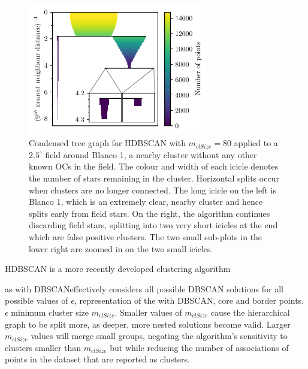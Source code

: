 \begin{figure}[t]
   \centering
   \includegraphics[width=0.7\textwidth]{fig/c2/fig_hdbscan.pdf}
   \caption{Condensed tree graph for HDBSCAN with $m_{clSize}=80$ applied to a $2.5^{\circ}$ field around Blanco 1, a nearby cluster without any other known OCs in the field. The colour and width of each icicle denotes the number of stars remaining in the cluster. Horizontal splits occur when clusters are no longer connected. The long icicle on the left is Blanco 1, which is an extremely clear, nearby cluster and hence splits early from field stars. On the right, the algorithm continues discarding field stars, splitting into two very short icicles at the end which are false positive clusters. The two small sub-plots in the lower right are zoomed in on the two small icicles.}\label{c2:fig:hdbscan}%
\end{figure}

HDBSCAN \citep{hutchison_hdbscan_2013} is a more recently developed clustering algorithm 

as with DBSCANeffectively considers all possible DBSCAN solutions for all possible values of $\epsilon$, representation of the with DBSCAN, core and border points. $\epsilon$ minimum cluster size $m_{clSize}$. Smaller values of $m_{clSize}$ cause the hierarchical graph to be split more, as deeper, more nested solutions become valid. Larger $m_{clSize}$ values will merge small groups, negating the algorithm's sensitivity to clusters smaller than $m_{clSize}$ but while reducing the number of associations of points in the dataset that are reported as clusters.

